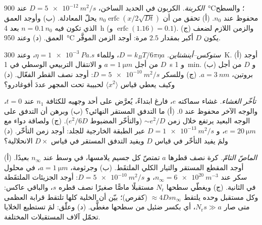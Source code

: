 \begin{exercise}[$\star\star$]\label{exo:b2:particle-diffusion:8}
\emph{الكربنة.} الكربون في الحديد الساخن، $D = \qty{5e-12}{m^2/s}$ عند
\qty{900}{\celsius}؛ والسطح محفوظ عند $n_0$. (أ) تحقق من أن $n_0
\operatorname{erfc}(x/2\sqrt{Dt})$ يحلّ المعادلة. (ب) وأوجد العمق الذي
تكون فيه $n = 0.1\,n_0$ بعد \qty{4}{h} (و $\operatorname{erfc}(1.16) = 0.1$).
(ج) والزمن اللازم لضعف العمق. (د) وعند \qty{950}{\celsius} يكون $D$ أكبر
بمقدار $2.5$ مرة: أوجد الزمن الموفَّر.
\end{exercise}

\begin{exercise}[$\star\star$]\label{exo:b2:particle-diffusion:9}
\emph{ستوكس--أينشتاين.} $D = k_BT/6\pi\eta a$، وللماء $\eta =
\qty{1e-3}{Pa.s}$، وعند \qty{300}{K}. (أ) أوجد $D$ من أجل $a = \qty{1}{\micro m}$ و
الانتقال التربيعي الوسطي في \qty{1}{s} و \qty{1}{min}. (ب) و $D$
من أجل بروتين، $a = \qty{3}{nm}$. (ج) وللسكر $D = \qty{5e-10}{m^2/s}$:
أوجد نصف القطر الفعّال. (د) وكيف يعطي قياس $\langle x^2\rangle$ لحبيبة
تحت المجهر عددَ أفوغادرو؟
\end{exercise}

\begin{exercise}[$\star\star\star$]\label{exo:b2:particle-diffusion:10}
\emph{تأخّر الغشاء.} غشاء سماكته $e$، فارغ ابتداءً،
يُعرَّض على أحد وجهيه للكثافة $n_1$ عند $t = 0$، والوجه الآخر محفوظ
عند $0$. (أ) ما التدفق المستقر النهائي؟ (ب) وبرهن أن التدفق
على الوجه البعيد يرتفع خلال زمن $\sim e^2/D$ (والتأخّر المضبوط
$e^2/6D$). (ج) ولصاقة دواء مع $e = \qty{20}{\micro m}$، و $D =
\qty{1e-13}{m^2/s}$ عبر الطبقة الخارجية للجلد: أوجد زمن التأخّر. (د) ولمَ
يفيد التأخّر في قياس $D$ ويفيد التدفق المستقر في قياس
$D \times$ الانحلالية؟
\end{exercise}

\begin{exercise}[$\star\star\star$]\label{exo:b2:particle-diffusion:11}
\emph{الماصّ التامّ.} كرة نصف قطرها $a$ تمتصّ كل
جسيم يلامسها، في وسط عند $n_\infty$ بعيدًا. (أ)
أوجد المقطع المستقر والتيار الكلي الملتقَط. (ب) وجرثومة، $a =
\qty{1}{\micro m}$، في محلول سكر عند $n_\infty = \qty{6e20}{m^{-3}}$،
و $D = \qty{5e-10}{m^2/s}$: أوجد الجزيئات الملتقَطة في الثانية. (ج) ويغطّي
سطحها $N_{\text{r}}$ مستقبلًا ماصًّا صغيرًا نصف قطره
$s$، والباقي عاكس: وكل مستقبل وحده يلتقط $\approx
4Ds n_\infty$ (كقرص)؛ بيّن أن الخلية كلها تلتقط قرابة
العظمى متى صار $N_{\text{r}} s \gg a$، أي بكسر ضئيل من
سطحها مغطًّى. (د) وعلّق: لمَ تستطيع الخلايا تحمّل آلاف
المستقبلات المختلفة.
\end{exercise}

